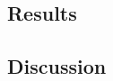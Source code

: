 \documentclass[12pt]{article}
\begin{document}
\subsection*{Results}


\paragraph*{}



\paragraph*{}



\paragraph*{}























\subsection*{Discussion}

\paragraph*{}



\paragraph*{}



\paragraph*{}



\paragraph*{}
\end{document}
